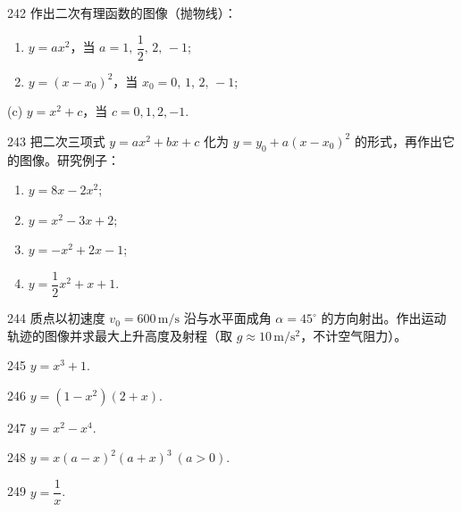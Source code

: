\begin{prob}[L]{242}
作出二次有理函数的图像（抛物线）：
\begin{enumerate}[label=(\alph*), itemsep=2pt, topsep=3pt]
\item $y = ax^2$，当 $a = 1,\, \dfrac{1}{2},\, 2,\, -1$;
\item $y = (x - x_0)^2$，当 $x_0 = 0,\, 1,\, 2,\, -1$;
\end{enumerate}
(c) $y = x^2 + c$，当 $c = 0, 1, 2, -1$.
\end{prob}

\begin{prob}[L]{243}
把二次三项式 $y = ax^2 + bx + c$ 化为 $y = y_0 + a(x - x_0)^2$ 的形式，再作出它的图像。研究例子：
\begin{enumerate}[label=(\alph*), itemsep=2pt, topsep=3pt]
  \item $y = 8x - 2x^2$;
  \item $y = x^2 - 3x + 2$;
  \item $y = -x^2 + 2x - 1$;
  \item $y = \dfrac{1}{2}x^2 + x + 1$.
\end{enumerate}
\end{prob}

\begin{prob}[M]{244}
质点以初速度 $v_0 = 600\,\mathrm{m/s}$ 沿与水平面成角 $\alpha = 45^\circ$ 的方向射出。作出运动轨迹的图像并求最大上升高度及射程（取 $g \approx 10\,\mathrm{m/s^2}$，不计空气阻力）。
\end{prob}


\begin{prob}[S]{245}
$y = x^3 + 1$.
\end{prob}

\begin{prob}[S]{246}
$y = (1 - x^2)(2 + x)$.
\end{prob}

\begin{prob}[S]{247}
$y = x^2 - x^4$.
\end{prob}

\begin{prob}[S]{248}
$y = x(a - x)^2(a + x)^3 \ (a > 0)$.
\end{prob}


\begin{prob}[S]{249}
$y = \dfrac{1}{x}$.
\end{prob}

